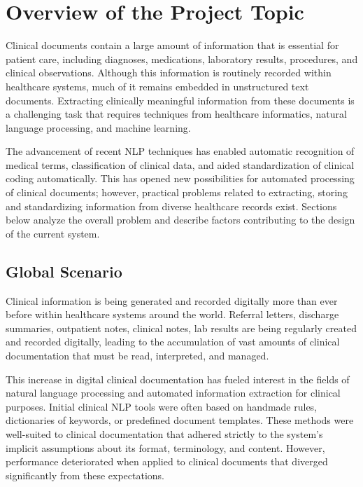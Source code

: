 \section{Overview of the Project Topic}

Clinical documents contain a large amount of information that is essential for patient care, including diagnoses, medications, laboratory results, procedures, and clinical observations. Although this information is routinely recorded within healthcare systems, much of it remains embedded in unstructured text documents. Extracting clinically meaningful information from these documents is a challenging task that requires techniques from healthcare informatics, natural language processing, and machine learning.

The advancement of recent NLP techniques has enabled automatic recognition of medical terms, classification of clinical data, and aided standardization of clinical coding automatically. This has opened new possibilities for automated processing of clinical documents; however, practical problems related to extracting, storing and standardizing information from diverse healthcare records exist. Sections below analyze the overall problem and describe factors contributing to the design of the current system.

\subsection{Global Scenario}

Clinical information is being generated and recorded digitally more than ever before within healthcare systems around the world. Referral letters, discharge summaries, outpatient notes, clinical notes, lab results are being regularly created and recorded digitally, leading to the accumulation of vast amounts of clinical documentation that must be read, interpreted, and managed.

This increase in digital clinical documentation has fueled interest in the fields of natural language processing and automated information extraction for clinical purposes. Initial clinical NLP tools were often based on handmade rules, dictionaries of keywords, or predefined document templates. These methods were well-suited to clinical documentation that adhered strictly to the system's implicit assumptions about its format, terminology, and content. However, performance deteriorated when applied to clinical documents that diverged significantly from these expectations.

